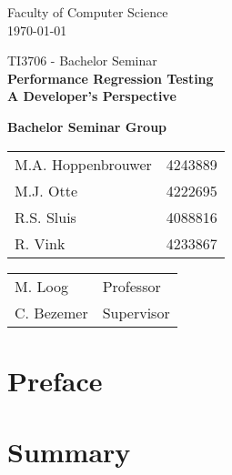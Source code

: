 \documentclass[oneside]{book}
\begin{document}
\frontmatter

\begin{titlepage}

\begin{center}
\begin{figure}[h!]
\centering
\end{figure}
Faculty of Computer Science \\
\today

\vspace{3.5cm}
\selectfont
{\Large TI3706 - Bachelor Seminar}\\
\vspace{0.0cm}
\Huge{\textbf{Performance Regression Testing\\ A Developer's Perspective}}
\vspace{0.5cm}
\selectfont

\vspace{5cm}
\normalsize{\textbf{Bachelor Seminar Group}}

\begin{tabular}{ l r}
\normalsize{M.A. Hoppenbrouwer} & \normalsize{4243889} \\
\normalsize{M.J. Otte} & \normalsize{4222695} \\
\normalsize{R.S. Sluis} & \normalsize{4088816} \\
\normalsize{R. Vink} & \normalsize{4233867}\\
\end{tabular}

\vspace{0.75cm}

\begin{tabular}{ l l }
\normalsize{M. Loog} & \normalsize{Professor} \\
\normalsize{C. Bezemer} & \normalsize{Supervisor} \\
\end{tabular}

\end{center}
\end{titlepage}

\chapter{Preface}


\chapter{Summary}
% 
\end{document}
